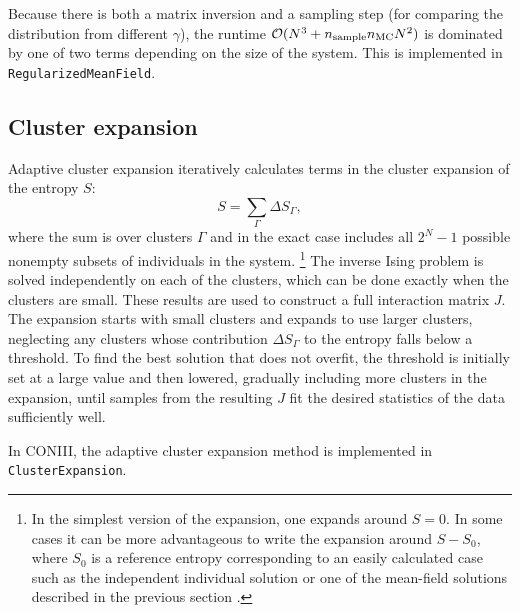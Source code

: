 \documentclass[aps,prl,twocolumn]{revtex4-1}
\begin{document}
Because there is both a matrix inversion and a sampling step (for comparing the distribution from different $\gamma$), the runtime $\mathcal{O}(N^3 + n_{\rm sample}n_{\rm MC}N^2)$ is dominated by one of two terms depending on the size of the system.
This is implemented in {\tt RegularizedMeanField}.



\subsection{Cluster expansion}
Adaptive cluster expansion \cite{CocMon11,CocMon12,BarCoc13}
iteratively calculates terms in the
cluster expansion of the entropy $S$:
\begin{equation}
S = \sum_\Gamma \Delta S_\Gamma,
\end{equation}
where the sum is over clusters $\Gamma$ and in the exact case
includes all $2^N - 1$ possible nonempty subsets of individuals in the system.
\footnote{In the simplest version of the expansion,
one expands around $S=0$.  In some cases it can be more advantageous to write the
expansion around $S-S_0$, where $S_0$ is a reference entropy corresponding to
an easily calculated case such as
the independent individual solution or one of the mean-field solutions
described in the previous section \cite{BarCoc13}.}
The inverse Ising problem is solved independently
on each of the clusters, which can be done exactly when the
clusters are small.  These results are used to construct a full
interaction matrix $J$.
The expansion starts with small clusters and expands to use larger
clusters, neglecting any clusters whose
contribution $\Delta S_\Gamma$ to the entropy falls below a threshold.
To find the best solution that does not overfit,
the threshold is initially set at a large value and then lowered,
gradually including more clusters in the expansion, until samples from
the resulting $J$ fit the desired statistics of the data sufficiently well.

In CONIII, the adaptive cluster expansion method is implemented in {\tt ClusterExpansion}.

%
\end{document}
